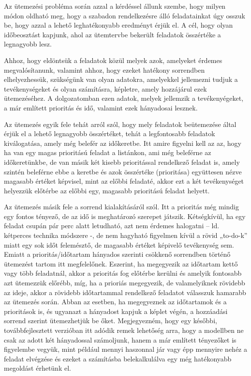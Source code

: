 

Az ütemezési probléma során azzal a kérdéssel állunk szembe, hogy milyen módon oldható meg, hogy a szabadon rendelkezésre álló feladatainkat úgy osszuk be, hogy azzal a lehető leghatékonyabb eredményt érjük el. A cél, hogy olyan időbeosztást kapjunk, ahol az ütemtervbe bekerült feladatok összértéke a legnagyobb lesz. 

Ahhoz, hogy eldöntsük a feladatok közül melyek azok, amelyeket érdemes megvalósítanunk, valamint ahhoz, hogy ezeket hatékony sorrendben elhelyezhessük, szükségünk van olyan adatokra, amelyekkel jellemezni tudjuk a tevékenységeket és olyan számításra, képletre, amely hozzájárul ezek ütemezéséhez. A dolgozatomban ezen adatok, melyek jellemzik a tevékenyégeket, a már említett prioritás és idő, valamint ezek hányadosai lesznek. 

Az ütemezés egyik fele tehát arról szól, hogy mely feladatok beütemezése által érjük el a lehető legnagyobb összértéket, tehát a legfontosabb feladatok kiválogatása, amely még belefér az időkeretbe. Itt amire figyelni kell az az, hogy ha van egy magas prioritású feladat a listánkon, ami még beleférne az időkeretünkbe, de van másik két kisebb prioritással rendelkező feladat is, amely szintén beleférne ebbe a keretbe és azok összértéke (prioritása) együttesen nézve magasabb értéket képvisel, mint az előbbi feladaté, akkor ezt a két tevékenységet helyezzük előtérbe az előbbi egy, magasabb prioritású feladat helyett.

Az ütemezés másik fele a sorrend kialakításáról szól. Itt a prioritás még mindig egy fontos tényező, de az idő is meghatározó szerepet játszik. Kétségkívül, ha egy feladat csupán pár perc alatt letudható, azt nem érdemes halogatni – ld. kétperces technika módszere -, de nem hagyható figyelmen kívül a rövid „to-do-k” miatt egy sok időt felemésztő, de magasabb értéket képivelő tevékenység sem. Emiatt a prioritás/időtartam hányados szerinti csökkenő sorrendben történő ütemezést tartom itt megfelelőnek. Eszerint, ha megegyezik az időtartam kettő vagy több feladatnál, akkor a prioritás fog előtérbe kerülni és amelyik fontosabb azt ütemezzük előrébb, míg, ha a prioriás megegyezik, de valamelyiknek rövidebb az ideje, akkor a rövidebb időtartammal rendelkező feladatot válasszuk hamarabb az ütemezés során. Abban az esetben, ha megegyeznek az időtartamok és a prioritások is, és ugyanazt a hányadost kapjuk a képlet végén, a hozzáadási sorrend szerint ütemezhetjük be őket. Megjegyezném, hogy egy későbbi, továbbfejlesztett verzióban itt adódik remek lehetőség arra, hogy a modellben ne csak az adott két hányadossal számoljunk, hanem a már említett tényezőket is figyelembe vegyük, mint például mennyi haszonnal jár vagy épp mennyire nehéz a feladat elvégzése és ezeket a számításba belekalkulálva egy még hatékonyabb megoldást érhetünk el.

